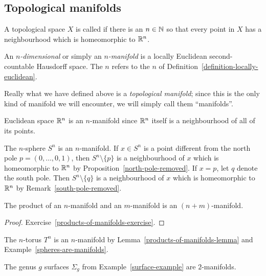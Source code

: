 \subsection{Topological manifolds}
\begin{defn}
  \label{definition-locally-euclidean}
  A topological space $X$ is called  if there is an $n \in \mathbb{N}$ so that every point in $X$ has a neighbourhood which is homeomorphic to $\mathbb{R}^n$.
\end{defn}
\begin{defn}
  An \emph{$n$-dimensional}  or simply an \emph{$n$-manifold} is a locally Euclidean second-countable Hausdorff space. The $n$ refers to the $n$ of Definition~\ref{definition-locally-euclidean}.
\end{defn}
Really what we have defined above is a \emph{topological manifold}; since this is the only kind of manifold we will encounter, we will simply call them ``manifolds''.
\begin{example}
  Euclidean space $\mathbb{R}^n$ is an $n$-manifold since $\mathbb{R}^n$ itself is a neighbourhood of all of its points.
\end{example}
\begin{example}
  \label{spheres-are-manifolds}
  The $n$-sphere $S^n$ is an $n$-manifold. If $x \in S^n$ is a point different from the north pole $p = (0,\dots,0,1)$, then $S^n \setminus \{p\}$ is a neighbourhood of $x$ which is homeomorphic to $\mathbb{R}^n$ by Proposition~\ref{north-pole-removed}. If $x = p$, let $q$ denote the south pole. Then $S^n \setminus \{q\}$ is a neighbourhood of $x$ which is homeomorphic to $\mathbb{R}^n$ by Remark~\ref{south-pole-removed}.
\end{example}
\begin{lem}
  \label{products-of-manifolds-lemma}
  The product of an $n$-manifold and an $m$-manifold is an $(n+m)$-manifold.
\end{lem}
\begin{proof}
  Exercise~\ref{products-of-manifolds-exercise}.
\end{proof}
\begin{example}
  The $n$-torus $T^n$ is an $n$-manifold by Lemma~\ref{products-of-manifolds-lemma} and Example~\ref{spheres-are-manifolds}.
\end{example}
\begin{example}
  The genus $g$ surfaces $\Sigma_g$ from Example~\ref{surface-example} are $2$-manifolds.
\end{example}

